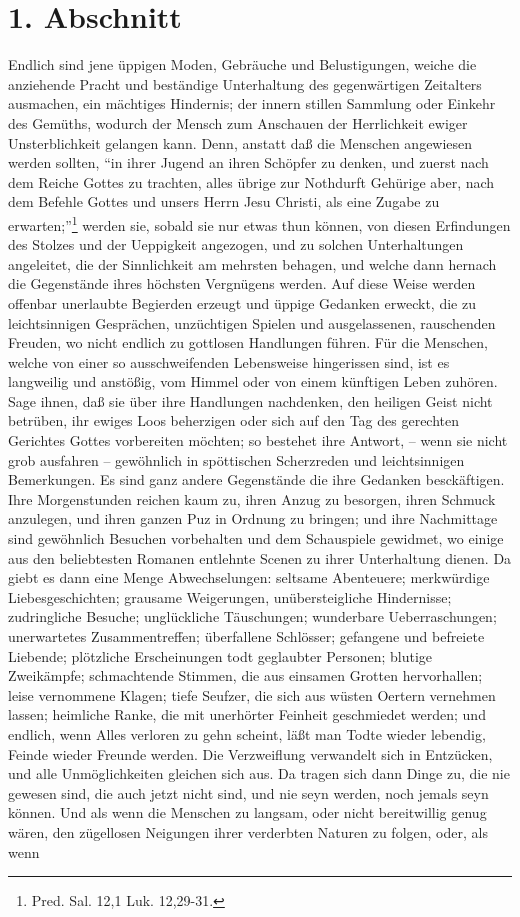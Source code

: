 \section{1. Abschnitt}

Endlich sind jene üppigen Moden, Gebräuche und Belustigungen, weiche die anziehende Pracht und beständige Unterhaltung des gegenwärtigen Zeitalters ausmachen, ein mächtiges Hindernis; der innern stillen Sammlung oder Einkehr des Gemüths, wodurch der Mensch zum Anschauen der Herrlichkeit ewiger Unsterblichkeit gelangen kann. Denn, anstatt daß die Menschen angewiesen werden sollten, "`in ihrer Jugend an ihren Schöpfer zu denken, und zuerst nach dem Reiche Gottes zu trachten, alles übrige zur Nothdurft Gehürige aber, nach dem Befehle Gottes und unsers Herrn Jesu Christi, als eine Zugabe zu erwarten;"'\footnote{Pred. Sal. 12,1 Luk. 12,29-31.} werden sie, sobald sie nur etwas thun können, von diesen Erfindungen des Stolzes und der Ueppigkeit angezogen, und zu solchen Unterhaltungen angeleitet, die der Sinnlichkeit am mehrsten behagen, und welche dann hernach die Gegenstände ihres höchsten Vergnügens werden. Auf diese Weise werden offenbar unerlaubte Begierden erzeugt und üppige Gedanken erweckt, die zu leichtsinnigen Gesprächen, unzüchtigen Spielen und ausgelassenen, rauschenden Freuden, wo nicht endlich zu gottlosen Handlungen führen. Für die Menschen, welche von einer so ausschweifenden Lebensweise hingerissen sind, ist es langweilig und anstößig, vom Himmel oder von einem künftigen Leben zuhören. Sage ihnen, daß sie über ihre Handlungen nachdenken, den heiligen Geist nicht betrüben, ihr ewiges Loos beherzigen oder sich auf den Tag des gerechten Gerichtes Gottes vorbereiten möchten; so bestehet ihre Antwort, -- wenn sie nicht grob ausfahren -- gewöhnlich in spöttischen Scherzreden und leichtsinnigen Bemerkungen. Es sind ganz andere Gegenstände die ihre Gedanken besckäftigen. Ihre Morgenstunden reichen kaum zu, ihren Anzug zu besorgen, ihren Schmuck anzulegen, und ihren ganzen Puz in Ordnung zu bringen; und ihre Nachmittage sind gewöhnlich Besuchen vorbehalten und dem Schauspiele gewidmet, wo einige aus den beliebtesten Romanen entlehnte Scenen zu ihrer Unterhaltung dienen. Da giebt es dann eine Menge Abwechselungen: seltsame Abenteuere; merkwürdige Liebesgeschichten; grausame Weigerungen, unübersteigliche Hindernisse; zudringliche Besuche; unglückliche Täuschungen; wunderbare Ueberraschungen; unerwartetes Zusammentreffen; überfallene Schlösser; gefangene und befreiete Liebende; plötzliche Erscheinungen todt geglaubter Personen; blutige Zweikämpfe; schmachtende Stimmen, die aus einsamen Grotten hervorhallen; leise vernommene Klagen; tiefe Seufzer, die sich aus wüsten Oertern vernehmen lassen; heimliche Ranke, die mit unerhörter Feinheit geschmiedet werden; und endlich, wenn Alles verloren zu gehn scheint, läßt man Todte wieder lebendig, Feinde wieder Freunde werden. Die Verzweiflung verwandelt sich in Entzücken, und alle Unmöglichkeiten gleichen sich aus. Da tragen sich dann Dinge zu, die nie gewesen sind, die auch jetzt nicht sind, und nie seyn werden, noch jemals seyn können. Und als wenn die Menschen zu langsam, oder nicht bereitwillig genug wären, den zügellosen Neigungen ihrer verderbten Naturen zu folgen, oder, als wenn 